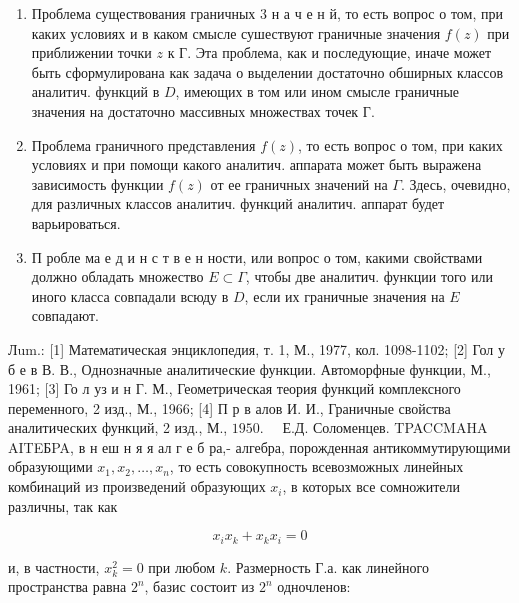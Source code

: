 \documentclass[10pt]{article}
\begin{document}
\begin{enumerate}

  \item Проблема существования граничных 3 н а ч е н й, то есть вопрос о том, при каких условиях и в каком смысле сушествуют граничные значения $f(z)$ при приближении точки $z$ к Г. Эта проблема, как и последующие, иначе может быть сформулирована как задача о выделении достаточно обширных классов аналитич. функций в $D$, имеющих в том или ином смысле граничные значения на достаточно массивных множествах точек Г.



  \item Проблема граничного представления $f(z)$, то есть вопрос о том, при каких условиях и при помощи какого аналитич. аппарата может быть выражена зависимость функции $f(z)$ от ее граничных значений на $\Gamma$. Здесь, очевидно, для различных классов аналитич. функций аналитич. аппарат будет варьироваться.



  \item П робле ма е д и н с т в е н ности, или вопрос о том, какими свойствами должно обладать множество $E \subset \Gamma$, чтобы две аналитич. функции того или иного класса совпадали всюду в $D$, если их граничные значения на $E$ совпадают.



\end{enumerate}



Лum.: [1] Математическая энциклопедия, т. 1, М., 1977, кол. 1098-1102; [2] Гол у б е в В. В., Однозначные аналитические функции. Автоморфные функции, М., 1961; [3] Го л уз и н Г. М., Геометрическая теория функций комплексного переменного, 2 изд., М., 1966; [4] П р в алов И. И., Граничные свойства аналитических функций, 2 изд., М., $1950 . \quad$ Е.Д. Соломенцев. TPACCMAHA AITEБPA, в н еш н я я ал г е б ра,- алгебра, порожденная антикоммутирующими образующими $x_{1}, x_{2}, \ldots, x_{n}$, то есть совокупность всевозможных линейных комбинаций из произведений образующих $x_{i}$, в которых все сомножители различны, так как



\[

x_{i} x_{k}+x_{k} x_{i}=0

\]



и, в частности, $x_{k}^{2}=0$ при любом $k$. Размерность Г.а. как линейного пространства равна $2^{n}$, базис состоит из $2^{n}$ одночленов:
\end{document}
